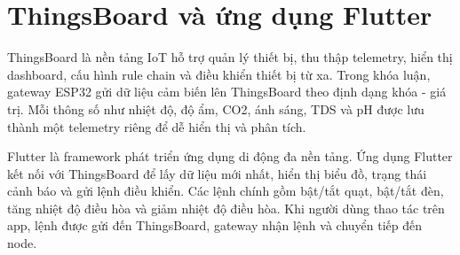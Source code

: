 \section{ThingsBoard và ứng dụng Flutter}
ThingsBoard là nền tảng IoT hỗ trợ quản lý thiết bị, thu thập telemetry, hiển thị dashboard, cấu hình rule chain và điều khiển thiết bị từ xa. Trong khóa luận, gateway ESP32 gửi dữ liệu cảm biến lên ThingsBoard theo định dạng khóa - giá trị. Mỗi thông số như nhiệt độ, độ ẩm, CO2, ánh sáng, TDS và pH được lưu thành một telemetry riêng để dễ hiển thị và phân tích.

Flutter là framework phát triển ứng dụng di động đa nền tảng. Ứng dụng Flutter kết nối với ThingsBoard để lấy dữ liệu mới nhất, hiển thị biểu đồ, trạng thái cảnh báo và gửi lệnh điều khiển. Các lệnh chính gồm bật/tắt quạt, bật/tắt đèn, tăng nhiệt độ điều hòa và giảm nhiệt độ điều hòa. Khi người dùng thao tác trên app, lệnh được gửi đến ThingsBoard, gateway nhận lệnh và chuyển tiếp đến node.

